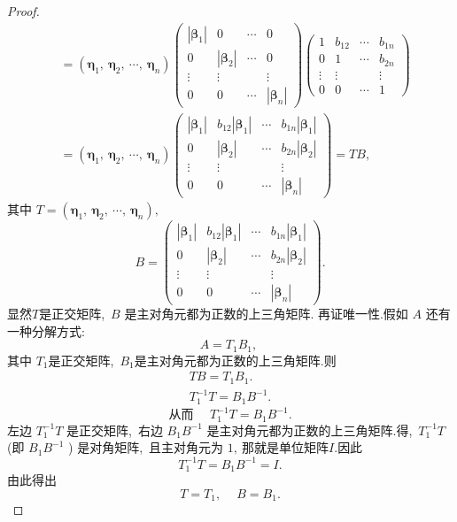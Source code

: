 \begin{proof}
$$\begin{aligned}
		&=\left(\boldsymbol{\eta}_{1},\  \boldsymbol{\eta}_{2},\  \cdots,\  \boldsymbol{\eta}_{n}\right)\left(\begin{array}{cccc}
			\left|\boldsymbol{\beta}_{1}\right| & 0 & \cdots & 0 \\
			0 & \left|\boldsymbol{\beta}_{2}\right| & \cdots & 0 \\
			\vdots & \vdots & & \vdots \\
			0 & 0 & \cdots & \left|\boldsymbol{\beta}_{n}\right|
		\end{array}\right)\left(\begin{array}{cccc}
			1 & b_{12} & \cdots & b_{1 n} \\
			0 & 1 & \cdots & b_{2 n} \\
			\vdots & \vdots & & \vdots \\
			0 & 0 & \cdots & 1
		\end{array}\right) \\
		&=\left(\boldsymbol{\eta}_{1},\  \boldsymbol{\eta}_{2},\  \cdots,\  \boldsymbol{\eta}_{n}\right)\left(\begin{array}{cccc}
			\left|\boldsymbol{\beta}_{1}\right| & b_{12}\left|\boldsymbol{\beta}_{1}\right| & \cdots & b_{1 n}\left|\boldsymbol{\beta}_{1}\right| \\
			0 & \left|\boldsymbol{\beta}_{2}\right| & \cdots & b_{2 n}\left|\boldsymbol{\beta}_{2}\right| \\
			\vdots & \vdots & & \vdots \\
			0 & 0 & \cdots & \left|\boldsymbol{\beta}_{n}\right|
		\end{array}\right)=T B,\ 
	\end{aligned}
	$$
	其中  $T=\left(\boldsymbol{\eta}_{1},\  \boldsymbol{\eta}_{2},\  \cdots,\  \boldsymbol{\eta}_{n}\right) ,\ $
	$$B=\left(\begin{array}{cccc}
		\left|\boldsymbol{\beta}_{1}\right| & b_{12}\left|\boldsymbol{\beta}_{1}\right| & \cdots & b_{1 n}\left|\boldsymbol{\beta}_{1}\right| \\
		0 & \left|\boldsymbol{\beta}_{2}\right| & \cdots & b_{2 n}\left|\boldsymbol{\beta}_{2}\right| \\
		\vdots & \vdots & & \vdots \\
		0 & 0 & \cdots & \left|\boldsymbol{\beta}_{n}\right|
	\end{array}\right) .$$
	显然$  T  $是正交矩阵,\  $ B $ 是主对角元都为正数的上三角矩阵.
	再证唯一性.假如  $A $ 还有一种分解方式:
	$$A=T_{1} B_{1},\ $$
	其中 $ T_{1} $是正交矩阵,\ $  B_{1}  $是主对角元都为正数的上三角矩阵.则
	$$\begin{array}{c}
		T B=T_{1} B_{1} . \\
		T_{1}^{-1} T=B_{1} B^{-1} .
	\end{array}$$
	$$\text { 从而 } \quad T_{1}^{-1} T=B_{1} B^{-1} \text {. }$$
	左边 $ T_{1}^{-1} T$  是正交矩阵,\  右边 $ B_{1} B^{-1}$ 是主对角元都为正数的上三角矩阵.得,\   $T_{1}^{-1} T $ (即  $B_{1} B^{-1}$  ) 是对角矩阵,\  且主对角元为 $1 ,\  $那就是单位矩阵$  I .$因此
	$$T_{1}^{-1} T=B_{1} B^{-1}=I .$$
	由此得出
	$$T=T_{1},\  \quad B=B_{1} .$$
\end{proof}
